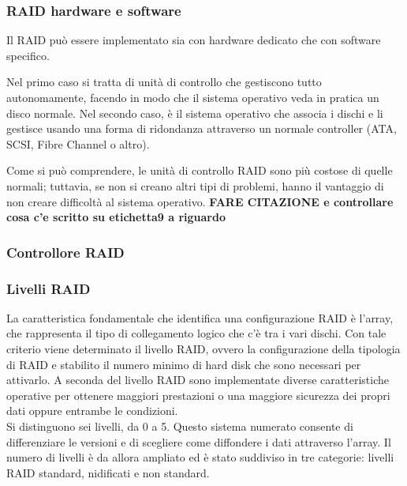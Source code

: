 \item
\subsubsection{RAID hardware e software}
Il RAID pu\`{o} essere implementato sia con hardware dedicato che con software specifico.

Nel primo caso si tratta di unit\`{a} di controllo che gestiscono tutto autonomamente, facendo in modo che il sistema operativo veda in pratica un disco normale. 
Nel secondo caso, \`{e} il sistema operativo che associa i dischi e li gestisce usando una forma di ridondanza attraverso un normale controller (ATA, SCSI, Fibre Channel o altro).

Come si pu\`{o} comprendere, le unit\`{a} di controllo RAID sono pi\`{u} costose di quelle normali; tuttavia, se non si creano altri tipi di problemi, hanno il vantaggio di non creare difficolt\`{a} al sistema operativo.
\textbf{FARE CITAZIONE e controllare cosa c'e scritto su etichetta9 a riguardo}

\item
\subsubsection{Controllore RAID}

\item
\subsubsection{Livelli RAID}
La caratteristica fondamentale che identifica una configurazione RAID \`{e} l'array, che rappresenta il tipo di collegamento logico che c'\`{e} tra i vari dischi.
Con tale criterio viene determinato il livello RAID, ovvero la configurazione della tipologia di RAID  e stabilito il numero minimo di hard disk che sono necessari per attivarlo. A seconda del livello RAID sono implementate diverse caratteristiche operative per ottenere maggiori prestazioni o una maggiore sicurezza dei propri dati oppure entrambe le condizioni.\\
Si distinguono sei livelli, da 0 a 5.
Questo sistema numerato consente di differenziare le versioni e di scegliere come diffondere i dati attraverso l'array. Il numero di livelli \`{e} da allora ampliato ed \`{e} stato suddiviso in tre categorie: livelli RAID standard, nidificati e non standard.\cite{etichetta9}


